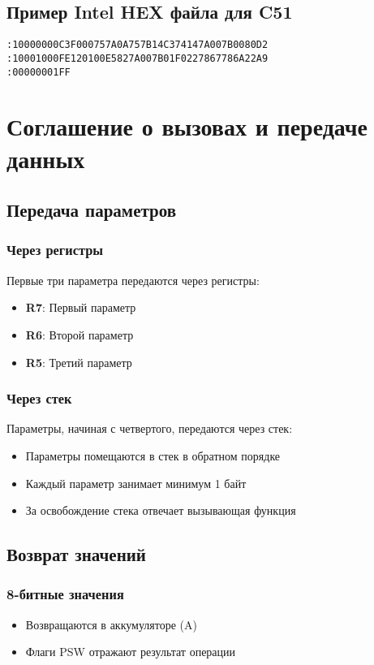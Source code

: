 \documentclass[a4paper, 12pt]{article}
\begin{document}
\subsection{Пример Intel HEX файла для C51}
\begin{verbatim}
:10000000C3F000757A0A757B14C374147A007B0080D2
:10001000FE120100E5827A007B01F0227867786A22A9
:00000001FF
\end{verbatim}

\section{Соглашение о вызовах и передаче данных}
\subsection{Передача параметров}
\subsubsection{Через регистры}
Первые три параметра передаются через регистры:
\begin{itemize}
    \item \textbf{R7}: Первый параметр
    \item \textbf{R6}: Второй параметр
    \item \textbf{R5}: Третий параметр
\end{itemize}

\subsubsection{Через стек}
Параметры, начиная с четвертого, передаются через стек:
\begin{itemize}
    \item Параметры помещаются в стек в обратном порядке
    \item Каждый параметр занимает минимум 1 байт
    \item За освобождение стека отвечает вызывающая функция
\end{itemize}

\subsection{Возврат значений}
\subsubsection{8-битные значения}
\begin{itemize}
    \item Возвращаются в аккумуляторе (A)
    \item Флаги PSW отражают результат операции
\end{itemize}
\end{document}
